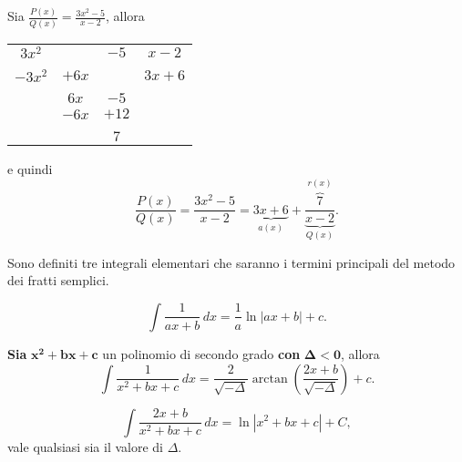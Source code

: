 \begin{example}
    Sia $\frac{P(x)}{Q(x)}=\frac{3x^2-5}{x-2}$, allora\\
    \begin{center}
        \begin{tabular}{ccc|c}
             $3x^2$ & &$-5$ & $x-2$\\
             \cline{4-4}\\
           $-3x^2$ & $+6x$ & & $3x+6$\\
            \cline{1-3}\\
            & $6x$ & $-5$&\\
            & $-6x$ &$+12$&\\
            \cline{2-3}\\
            && $7$&
        \end{tabular}
    \end{center}
    e quindi
    \begin{equation*}
        \frac{P(x)}{Q(x)}=\frac{3x^2-5}{x-2}= \underbrace{3x+6}_{a(x)}+\frac{\overbrace{7}^{r(x)}}{\underbrace{x-2}_{Q(x)}}.
    \end{equation*}
\end{example}

Sono definiti tre integrali elementari che saranno i termini principali del metodo dei fratti semplici.
\begin{definition}[Elementare 1]
    \begin{equation*}
        \int\frac{1}{ax+b}\, dx= \frac{1}{a}\ln|ax+b|+c.
    \end{equation*}
\end{definition}

\begin{definition}[Elementare 2]
    \textbf{Sia} $\boldsymbol{x^2+bx+c}$ un polinomio di secondo grado \textbf{con} $\boldsymbol{\Delta<0}$, allora
    \begin{equation*}
        \int\frac{1}{x^2+bx+c}\,dx = \frac{2}{\sqrt{-\Delta}}\arctan\left(\frac{2x+b}{\sqrt{-\Delta}}\right)+ c.
    \end{equation*}
\end{definition}

\begin{definition}[Elementare 3]
    \begin{equation*}
        \int\frac{2x+b}{x^2+bx+c}\, dx=\ln|x^2+bx+c| + C,
    \end{equation*}
    vale qualsiasi sia il valore di $\Delta$.
\end{definition}

